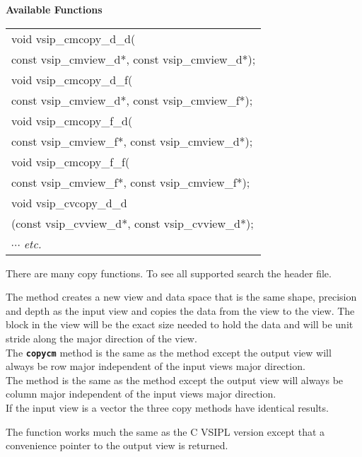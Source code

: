 \cvsiplh
\newline \hspace*{.8cm} \vspace*{.1cm} \textbf{Available Functions }
\newline \hspace*{1cm} {\ttfamily
\begin{tabular}[H]{l}
void vsip\_cmcopy\_d\_d(\\*
\hspace{1cm}const vsip\_cmview\_d*, const vsip\_cmview\_d*);\\
void vsip\_cmcopy\_d\_f(\\*
\hspace{1cm}const vsip\_cmview\_d*, const vsip\_cmview\_f*);\\
void vsip\_cmcopy\_f\_d(\\*
\hspace{1cm}const vsip\_cmview\_f*, const vsip\_cmview\_d*);\\
void vsip\_cmcopy\_f\_f(\\*
\hspace{1cm}const vsip\_cmview\_f*, const vsip\_cmview\_f*);\\
void vsip\_cvcopy\_d\_d\\*
\hspace{1cm}(const vsip\_cvview\_d*, const vsip\_cvview\_d*);\\
$\cdots$  \emph{etc.} \end{tabular}
}
\newline \hspace*{1cm}
\parbox{11cm}{There are many copy functions. To see all supported search the  header file.\footnotemark}
\pyjvsiph
{}
\newline\hspace*{1cm}\parbox{11cm}{The  method creates a new view and data space that is the same shape, precision and depth as the input view and copies the data from the  view to the  view. The block in the  view will be the exact size needed to hold the data and will be unit stride along the major direction of the  view.\\The {\texttt{\bfseries{copycm}}} method is the same as the  method except the output view will always be row major independent of the input views major direction.\\The {} method is the same as the  method except the output view will always be column major independent of the input views major direction.\\If the input view is a vector the three copy methods have identical results.}
\newline
{}
\newline\hspace*{1cm}\parbox{11cm}{The  function works much the same as the C VSIPL version except that a convenience pointer to the output view is returned.}
